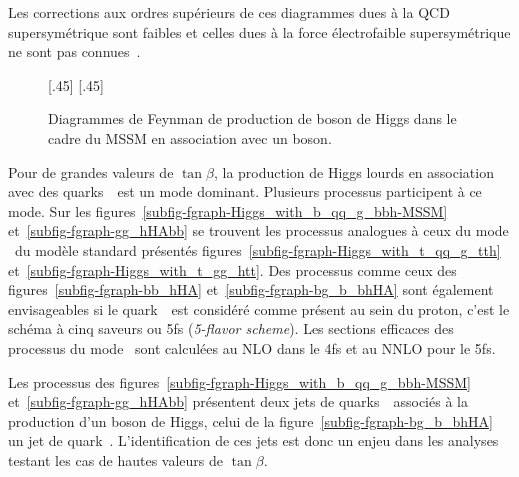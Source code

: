 Les corrections aux ordres supérieurs de ces diagrammes dues à la QCD supersymétrique sont faibles et celles dues à la force électrofaible supersymétrique ne sont pas connues~\cite{Higgs_xsec_book_1}.
\begin{figure}[h]
\centering
\vspace{\baselineskip}
[.45\textwidth]
{\vspace{\baselineskip}}
\hfill
{}[.45\textwidth]
{\vspace{\baselineskip}}
\caption[Production de boson de Higgs du MSSM en association avec un boson.]{Diagrammes de Feynman de production de boson de Higgs dans le cadre du MSSM en association avec un boson.}
\label{fig-fgraph-Higgs_prod_VH_ggZh-MSSM}
\end{figure}
\par Pour de grandes valeurs de $\tan\beta$, la production de Higgs lourds en association avec des quarks~\quarkb\ est un mode dominant.
Plusieurs processus participent à ce mode.
Sur les figures~\ref{subfig-fgraph-Higgs_with_b_qq_g_bbh-MSSM} et~\ref{subfig-fgraph-gg_hHAbb} se trouvent les processus analogues à ceux du mode \ttbar\higgs\ du modèle standard présentés figures~\ref{subfig-fgraph-Higgs_with_t_qq_g_tth} et~\ref{subfig-fgraph-Higgs_with_t_gg_htt}.
Des processus comme ceux des figures~\ref{subfig-fgraph-bb_hHA} et~\ref{subfig-fgraph-bg_b_bhHA} sont également envisageables si le quark~\quarkb\ est considéré comme présent au sein du proton, c'est le \og schéma à cinq saveurs \fg{} ou 5fs (\emph{5-flavor scheme}).
Les sections efficaces des processus du mode \quarkb\antiquarkb\higgs\ sont calculées au NLO dans le 4fs et au NNLO pour le 5fs.
\par Les processus des figures~\ref{subfig-fgraph-Higgs_with_b_qq_g_bbh-MSSM} et~\ref{subfig-fgraph-gg_hHAbb} présentent deux jets de quarks~\quarkb\ associés à la production d'un boson de Higgs, celui de la figure~\ref{subfig-fgraph-bg_b_bhHA} un jet de quark~\quarkb.
L'identification de ces jets est donc un enjeu dans les analyses testant les cas de hautes valeurs de $\tan\beta$.
